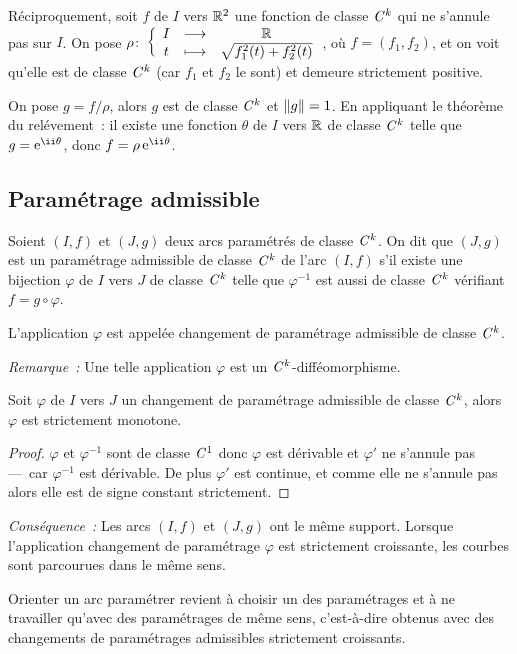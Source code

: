 Réciproquement, soit $f$ de $I$ vers $\mathbb{R}^2$ une fonction de classe $\mathit{C}^k$ qui  ne s'annule pas sur $I$. On pose $\rho\colon \left\{\begin{array}{ccc} I & \longrightarrow &\mathbb{R}\\ t & \longmapsto & \sqrt{f_1^2(t)+f_2^2(t)} \end{array} \right.$, où $f=(f_1, f_2)$, et on voit qu'elle est de classe $\mathit{C}^k$ (car $f_1$ et $f_2$ le sont) et demeure strictement positive. 

On pose $g=f/\rho$, alors $g$ est de classe $\mathit{C}^k$ et $\left\lVert g\right\rVert=1$. En appliquant le théorème du relévement~: il existe une fonction $\theta$ de $I$ vers $\mathbb{R}$ de classe $\mathit{C}^k$ telle que $g=\e^{\ii \theta}$, donc $f=\rho \e^{\ii \theta}$.

\subsection{Paramétrage admissible}

\begin{defdef}
  Soient $(I, f)$ et $(J, g)$ deux arcs paramétrés de classe $\mathit{C}^k$. On dit que $(J, g)$ est un paramétrage admissible de classe $\mathit{C}^k$ de l'arc $(I, f)$ s'il existe une bijection $\varphi$ de $I$ vers $J$ de classe $\mathit{C}^k$ telle que $\varphi^{-1}$ est aussi de classe $\mathit{C}^k$ vérifiant $f=g \circ \varphi$.

L'application $\varphi$ est appelée changement de paramétrage admissible de classe $\mathit{C}^k$.
\end{defdef}

\emph{Remarque~:} Une telle application $\varphi$ est un $\mathit{C}^k$-difféomorphisme.

\begin{prop}
  Soit $\varphi$ de $I$ vers $J$ un changement de paramétrage admissible de classe $\mathit{C}^k$, alors $\varphi$ est strictement monotone.
\end{prop}
\begin{proof}
$\varphi$ et $\varphi^{-1}$ sont de classe $\mathit{C}^1$ donc $\varphi$ est dérivable et $\varphi'$ ne s'annule pas ---~car $\varphi^{-1}$ est dérivable. De plus $\varphi'$ est continue, et comme elle ne s'annule pas alors elle est de signe constant strictement.
\end{proof}

\emph{Conséquence~:} Les arcs $(I, f)$ et $(J, g)$ ont le même support. Lorsque l'application changement de paramétrage $\varphi$ est strictement croissante, les courbes sont parcourues dans le même sens.

\begin{defdef}
  Orienter un arc paramétrer revient à choisir un des paramétrages et à ne travailler qu'avec des paramétrages de même sens, c'est-à-dire obtenus avec des changements de paramétrages admissibles strictement croissants.
\end{defdef}

